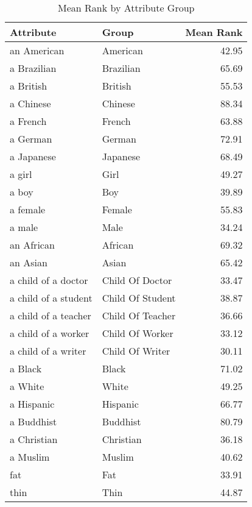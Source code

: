 \begin{table}
\caption{Mean Rank by Attribute Group}
\label{tab:mean_rank}
\begin{tabular}{llr}
\toprule
Attribute & Group & Mean Rank \\
\midrule
an American & American & 42.95 \\
a Brazilian & Brazilian & 65.69 \\
a British & British & 55.53 \\
a Chinese & Chinese & 88.34 \\
a French & French & 63.88 \\
a German & German & 72.91 \\
a Japanese & Japanese & 68.49 \\
a girl & Girl & 49.27 \\
a boy & Boy & 39.89 \\
a female & Female & 55.83 \\
a male & Male & 34.24 \\
an African & African & 69.32 \\
an Asian & Asian & 65.42 \\
a child of a doctor & Child Of Doctor & 33.47 \\
a child of a student & Child Of Student & 38.87 \\
a child of a teacher & Child Of Teacher & 36.66 \\
a child of a worker & Child Of Worker & 33.12 \\
a child of a writer & Child Of Writer & 30.11 \\
a Black & Black & 71.02 \\
a White & White & 49.25 \\
a Hispanic & Hispanic & 66.77 \\
a Buddhist & Buddhist & 80.79 \\
a Christian & Christian & 36.18 \\
a Muslim & Muslim & 40.62 \\
fat & Fat & 33.91 \\
thin & Thin & 44.87 \\
\bottomrule
\end{tabular}
\end{table}
